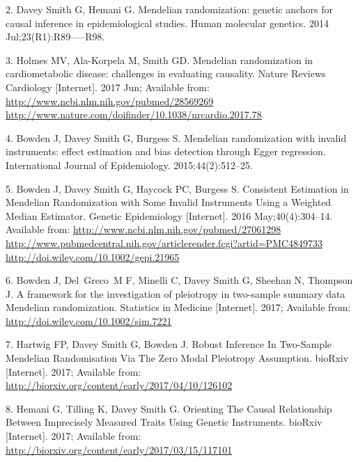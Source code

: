 \documentclass[]{article}
\begin{document}
\hypertarget{ref-DaveySmithHemani2014}{}
2. Davey Smith G, Hemani G. Mendelian randomization: genetic anchors for
causal inference in epidemiological studies. Human molecular genetics.
2014 Jul;23(R1):R89-----R98.

\hypertarget{ref-Holmes2017}{}
3. Holmes MV, Ala-Korpela M, Smith GD. Mendelian randomization in
cardiometabolic disease: challenges in evaluating causality. Nature
Reviews Cardiology {[}Internet{]}. 2017 Jun; Available from:
\href{http://www.ncbi.nlm.nih.gov/pubmed/28569269\%20http://www.nature.com/doifinder/10.1038/nrcardio.2017.78}{http://www.ncbi.nlm.nih.gov/pubmed/28569269 http://www.nature.com/doifinder/10.1038/nrcardio.2017.78}

\hypertarget{ref-Bowden2015}{}
4. Bowden J, Davey Smith G, Burgess S. Mendelian randomization with
invalid instruments: effect estimation and bias detection through Egger
regression. International Journal of Epidemiology. 2015;44(2):512--25.

\hypertarget{ref-Bowden2016b}{}
5. Bowden J, Davey Smith G, Haycock PC, Burgess S. Consistent Estimation
in Mendelian Randomization with Some Invalid Instruments Using a
Weighted Median Estimator. Genetic Epidemiology {[}Internet{]}. 2016
May;40(4):304--14. Available from:
\href{http://www.ncbi.nlm.nih.gov/pubmed/27061298\%20http://www.pubmedcentral.nih.gov/articlerender.fcgi?artid=PMC4849733\%20http://doi.wiley.com/10.1002/gepi.21965}{http://www.ncbi.nlm.nih.gov/pubmed/27061298 http://www.pubmedcentral.nih.gov/articlerender.fcgi?artid=PMC4849733 http://doi.wiley.com/10.1002/gepi.21965}

\hypertarget{ref-Bowden2017}{}
6. Bowden J, Del~Greco~M F, Minelli C, Davey Smith G, Sheehan N,
Thompson J. A framework for the investigation of pleiotropy in
two-sample summary data Mendelian randomization. Statistics in Medicine
{[}Internet{]}. 2017; Available from:
\url{http://doi.wiley.com/10.1002/sim.7221}

\hypertarget{ref-Hartwig2017}{}
7. Hartwig FP, Davey Smith G, Bowden J. Robust Inference In Two-Sample
Mendelian Randomisation Via The Zero Modal Pleiotropy Assumption.
bioRxiv {[}Internet{]}. 2017; Available from:
\url{http://biorxiv.org/content/early/2017/04/10/126102}

\hypertarget{ref-Hemani2017}{}
8. Hemani G, Tilling K, Davey Smith G. Orienting The Causal Relationship
Between Imprecisely Measured Traits Using Genetic Instruments. bioRxiv
{[}Internet{]}. 2017; Available from:
\url{http://biorxiv.org/content/early/2017/03/15/117101}
\end{document}
